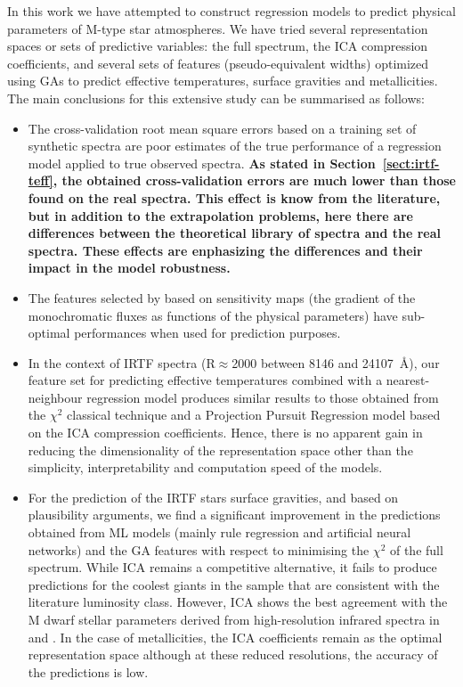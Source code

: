 
In this work we have attempted to construct regression models to
predict physical parameters of M-type star atmospheres. We have tried
several representation spaces or sets of predictive variables: the
full spectrum, the ICA compression coefficients, and several sets of
features (pseudo-equivalent widths) optimized using GAs to predict
effective temperatures, surface gravities and metallicities. The main
conclusions for this extensive study can be summarised as follows:
\begin{itemize}

\item The cross-validation root mean square errors based on a training
  set of synthetic spectra are poor estimates of the true performance
  of a regression model applied to true observed spectra.
      \textbf{
	As stated in Section~\ref{sect:irtf-teff}, the obtained 
	cross-validation errors are much lower than those found on the
	real spectra. This effect is know from the literature, but 
	in addition to the extrapolation problems, 
	here there are differences between the theoretical 
	library of spectra and the real spectra.
	These effects are enphasizing the differences and their
	impact in the model robustness.
      }

\item The features selected by \cite{cesetti} based on sensitivity 
      maps (the gradient of the monochromatic fluxes as functions of the 
      physical parameters) have sub-optimal performances when used 
      for prediction purposes.

\item In the context of IRTF spectra (R$\approx$2000 between 8146 and
  24107\ \AA), our feature set for predicting effective temperatures
  combined with a nearest-neighbour regression model produces similar
  results to those obtained from the $\chi^2$ classical technique and
  a Projection Pursuit Regression model based on the ICA compression
  coefficients. Hence, there is no apparent gain in reducing the
  dimensionality of the representation space other than the
  simplicity, interpretability and computation speed of the models.

\item For the prediction of the IRTF stars surface gravities, and
  based on plausibility arguments, we find a significant improvement
  in the predictions obtained from ML models (mainly
  rule regression and artificial neural networks) and the GA features
  with respect to minimising the $\chi^2$ of the full spectrum. While
  ICA remains a competitive alternative, it fails to produce
  predictions for the coolest giants in the sample that are consistent
  with the literature luminosity class. However, ICA shows the best
  agreement with the M dwarf stellar parameters derived from
  high-resolution infrared spectra in \cite{esm1} and \cite{esm2}. In
  the case of metallicities, the ICA coefficients remain as the
  optimal representation space although at these reduced resolutions,
  the accuracy of the predictions is low.


\end{itemize}
